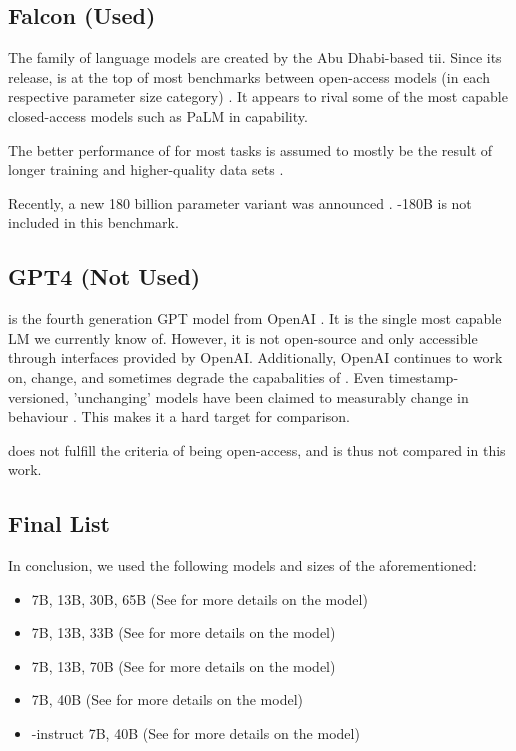 \subsection{Falcon (Used)}\label{sub:falcon}
The  \cite{zxhang_falcon_2023} family of language models are created by the Abu Dhabi-based \gls{tii}.
Since its release,  is at the top of most benchmarks between open-access models (in each respective parameter size category) \cite{zxhang_falcon_2023}.
It appears to rival some of the most capable closed-access models such as \gls{PaLM} in capability.

The better performance of  for most tasks is assumed to mostly be the result of longer training and higher-quality data sets \cite{zxhang_falcon_2023}.

Recently, a new 180 billion parameter  variant was announced \cite{tii_falcon180b_2023}. -180B is not included in this benchmark.


\subsection{GPT4 (Not Used)}\label{sub:GPT4}
 is the fourth generation \gls{GPT} model from \gls{OpenAI} \cite{openai_gpt4_2023}.
It is the single most capable \acrlong{LM} we currently know of.
However, it is not open-source and only accessible through interfaces provided by \gls{OpenAI}.
Additionally, \gls{OpenAI} continues to work on, change, and sometimes degrade the capabalities of  \cite{chen_how_2023}.
Even timestamp-versioned, 'unchanging' models have been claimed to measurably change in behaviour \cite{jw1224_hn}.
This makes it a hard target for comparison.

 does not fulfill the criteria of being open-access, and is thus not compared in this work.


\subsection{Final List}\label{sub:list}
In conclusion, we used the following models and sizes of the aforementioned:
\begin{itemize}
    \item {} 7B, 13B, 30B, 65B (See  for more details on the model)
    \item {} 7B, 13B, 33B (See  for more details on the model)
    \item {} 7B, 13B, 70B (See  for more details on the model)
    \item {} 7B, 40B (See  for more details on the model)
    \item {}-instruct 7B, 40B (See  for more details on the model)
\end{itemize}
